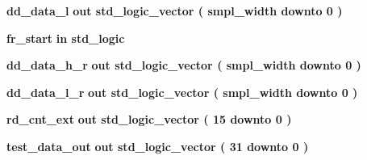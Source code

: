 \begin{DoxyCompactItemize}
\item 
{\bf dd\+\_\+data\+\_\+l}  {\bfseries {\bfseries \textcolor{keywordflow}{out}\textcolor{vhdlchar}{ }}} {\bfseries \textcolor{comment}{std\+\_\+logic\+\_\+vector}\textcolor{vhdlchar}{ }\textcolor{vhdlchar}{(}\textcolor{vhdlchar}{ }\textcolor{vhdlchar}{ }\textcolor{vhdlchar}{ }\textcolor{vhdlchar}{ }{\bfseries {\bf smpl\+\_\+width}} \textcolor{vhdlchar}{ }\textcolor{keywordflow}{downto}\textcolor{vhdlchar}{ }\textcolor{vhdlchar}{ } \textcolor{vhdldigit}{0} \textcolor{vhdlchar}{ }\textcolor{vhdlchar}{)}\textcolor{vhdlchar}{ }} 
\item 
{\bf fr\+\_\+start}  {\bfseries {\bfseries \textcolor{keywordflow}{in}\textcolor{vhdlchar}{ }}} {\bfseries \textcolor{comment}{std\+\_\+logic}\textcolor{vhdlchar}{ }} 
\item 
{\bf dd\+\_\+data\+\_\+h\+\_\+r}  {\bfseries {\bfseries \textcolor{keywordflow}{out}\textcolor{vhdlchar}{ }}} {\bfseries \textcolor{comment}{std\+\_\+logic\+\_\+vector}\textcolor{vhdlchar}{ }\textcolor{vhdlchar}{(}\textcolor{vhdlchar}{ }\textcolor{vhdlchar}{ }\textcolor{vhdlchar}{ }\textcolor{vhdlchar}{ }{\bfseries {\bf smpl\+\_\+width}} \textcolor{vhdlchar}{ }\textcolor{keywordflow}{downto}\textcolor{vhdlchar}{ }\textcolor{vhdlchar}{ } \textcolor{vhdldigit}{0} \textcolor{vhdlchar}{ }\textcolor{vhdlchar}{)}\textcolor{vhdlchar}{ }} 
\item 
{\bf dd\+\_\+data\+\_\+l\+\_\+r}  {\bfseries {\bfseries \textcolor{keywordflow}{out}\textcolor{vhdlchar}{ }}} {\bfseries \textcolor{comment}{std\+\_\+logic\+\_\+vector}\textcolor{vhdlchar}{ }\textcolor{vhdlchar}{(}\textcolor{vhdlchar}{ }\textcolor{vhdlchar}{ }\textcolor{vhdlchar}{ }\textcolor{vhdlchar}{ }{\bfseries {\bf smpl\+\_\+width}} \textcolor{vhdlchar}{ }\textcolor{keywordflow}{downto}\textcolor{vhdlchar}{ }\textcolor{vhdlchar}{ } \textcolor{vhdldigit}{0} \textcolor{vhdlchar}{ }\textcolor{vhdlchar}{)}\textcolor{vhdlchar}{ }} 
\item 
{\bf rd\+\_\+cnt\+\_\+ext}  {\bfseries {\bfseries \textcolor{keywordflow}{out}\textcolor{vhdlchar}{ }}} {\bfseries \textcolor{comment}{std\+\_\+logic\+\_\+vector}\textcolor{vhdlchar}{ }\textcolor{vhdlchar}{(}\textcolor{vhdlchar}{ }\textcolor{vhdlchar}{ } \textcolor{vhdldigit}{15} \textcolor{vhdlchar}{ }\textcolor{keywordflow}{downto}\textcolor{vhdlchar}{ }\textcolor{vhdlchar}{ } \textcolor{vhdldigit}{0} \textcolor{vhdlchar}{ }\textcolor{vhdlchar}{)}\textcolor{vhdlchar}{ }} 
\item 
{\bf test\+\_\+data\+\_\+out}  {\bfseries {\bfseries \textcolor{keywordflow}{out}\textcolor{vhdlchar}{ }}} {\bfseries \textcolor{comment}{std\+\_\+logic\+\_\+vector}\textcolor{vhdlchar}{ }\textcolor{vhdlchar}{(}\textcolor{vhdlchar}{ }\textcolor{vhdlchar}{ } \textcolor{vhdldigit}{31} \textcolor{vhdlchar}{ }\textcolor{keywordflow}{downto}\textcolor{vhdlchar}{ }\textcolor{vhdlchar}{ } \textcolor{vhdldigit}{0} \textcolor{vhdlchar}{ }\textcolor{vhdlchar}{)}\textcolor{vhdlchar}{ }} 

\end{DoxyCompactItemize}
